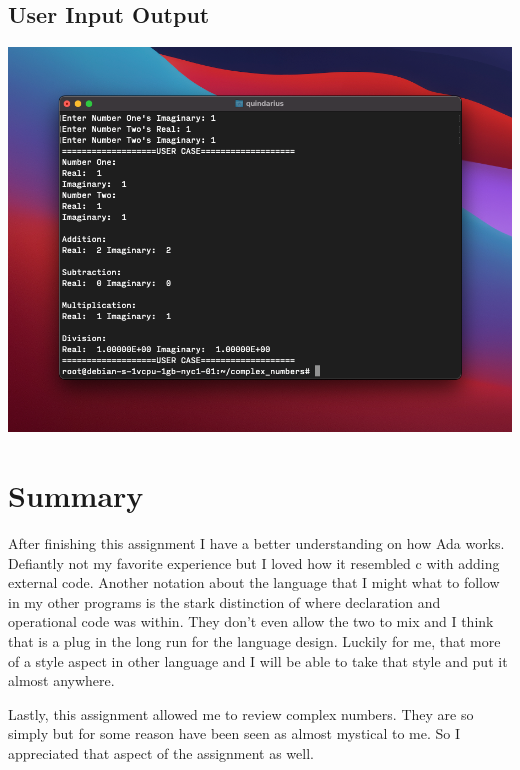 \documentclass{report}
\begin{document}
\subsection*{User Input Output}
\includegraphics[width = \textwidth]{images/ada4}

\section{Summary}
After finishing this assignment I have a better understanding on how Ada works. Defiantly not my favorite experience but I loved how it resembled c with adding external code. 
Another notation about the language that I might what to follow in my other programs is the stark distinction of where declaration and operational code was within. 
They don't even allow the two to mix and I think that is a plug in the long run for the language design. 
Luckily for me, that more of a style aspect in other language and I will be able to take that style and put it almost anywhere. 

Lastly, this assignment allowed me to review complex numbers.
They are so simply but for some reason have been seen as almost mystical to me. 
So I appreciated that aspect of the assignment as well.
\end{document}
